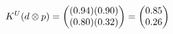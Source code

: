 \documentclass[preview]{standalone}
\begin{document}
\begin{align*}
\special{dvisvgm:raw <g id='unique000'>}K^U(d \otimes p) = \begin{pmatrix} (0.94)(0.90) \\ (0.80)(0.32) \end{pmatrix} = \begin{pmatrix} 0.85 \\ 0.26 \end{pmatrix}\special{dvisvgm:raw </g>}
\end{align*}
\end{document}
